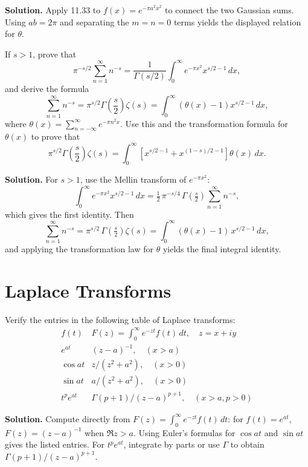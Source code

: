 \noindent\textbf{Solution.}
Apply 11.33 to $f(x)=e^{-\pi a^2 x^2}$ to connect the two Gaussian sums. Using $ab=2\pi$ and separating the $m=n=0$ terms yields the displayed relation for $\theta$.

\begin{problembox}
If $s > 1$, prove that
\[
\pi^{-s/2} \sum_{n=1}^\infty n^{-s} = \frac{1}{\Gamma(s/2)} \int_0^\infty e^{-\pi x^2} x^{s/2-1} \, dx,
\]
and derive the formula
\[
\sum_{n=1}^\infty n^{-s} = \pi^{s/2} \Gamma\left(\frac{s}{2}\right) \zeta(s) = \int_0^\infty \left( \theta(x) - 1 \right) x^{s/2-1} \, dx,
\]
where $\theta(x) = \sum_{n=-\infty}^\infty e^{-\pi n^2 x}$. Use this and the transformation formula for $\theta(x)$ to prove that
\[
\pi^{s/2} \Gamma\left(\frac{s}{2}\right) \zeta(s) = \int_0^\infty \left[ x^{s/2-1} + x^{(1-s)/2-1} \right] \theta(x) \, dx.
\]
\end{problembox}

\noindent\textbf{Solution.}
For $s>1$, use the Mellin transform of $e^{-\pi x^2}$:
\[\int_0^{\infty} e^{-\pi x^2} x^{s/2-1}\,dx = \tfrac{1}{2}\,\pi^{-s/4}\,\Gamma\!\left(\tfrac{s}{2}\right)\sum_{n=1}^{\infty} n^{-s},\]
which gives the first identity. Then
\[\sum_{n=1}^{\infty} n^{-s}=\pi^{s/2}\,\Gamma\!\left(\tfrac{s}{2}\right)\zeta(s)=\int_0^{\infty} (\theta(x)-1)\,x^{s/2-1}\,dx,\]
and applying the transformation law for $\theta$ yields the final integral identity.

\section{Laplace Transforms}

\begin{problembox}
Verify the entries in the following table of Laplace transforms:
\[
\begin{array}{ll}
f(t) & F(z) = \int_0^\infty e^{-zt} f(t) \, dt, \quad z = x + iy \\
e^{at} & (z - a)^{-1}, \quad (x > a) \\
\cos at & z/(z^2 + a^2), \quad (x > 0) \\
\sin at & a/(z^2 + a^2), \quad (x > 0) \\
t^p e^{at} & \Gamma(p + 1)/(z - a)^{p+1}, \quad (x > a, p > 0)
\end{array}
\]
\end{problembox}

\noindent\textbf{Solution.}
Compute directly from $F(z)=\int_0^{\infty} e^{-zt} f(t)\,dt$: for $f(t)=e^{at}$, $F(z)=(z-a)^{-1}$ when $\Re z>a$. Using Euler's formulas for $\cos at$ and $\sin at$ gives the listed entries. For $t^p e^{at}$, integrate by parts or use $\Gamma$ to obtain $\Gamma(p+1)/(z-a)^{p+1}$.

